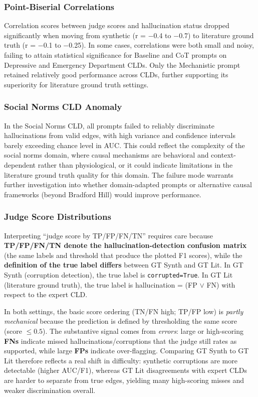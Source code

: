 \subsubsection{Point-Biserial Correlations}

Correlation scores between judge scores and hallucination status dropped significantly when moving from synthetic (r = $-$0.4 to $-$0.7) to literature ground truth (r = $-$0.1 to $-$0.25). In some cases, correlations were both small and noisy, failing to attain statistical significance for Baseline and CoT prompts on Depressive and Emergency Department CLDs. Only the Mechanistic prompt retained relatively good performance across CLDs, further supporting its superiority for literature ground truth settings.

\subsubsection{Social Norms CLD Anomaly}

In the Social Norms CLD, all prompts failed to reliably discriminate hallucinations from valid edges, with high variance and confidence intervals barely exceeding chance level in AUC. This could reflect the complexity of the social norms domain, where causal mechanisms are behavioral and context-dependent rather than physiological, or it could indicate limitations in the literature ground truth quality for this domain. The failure mode warrants further investigation into whether domain-adapted prompts or alternative causal frameworks (beyond Bradford Hill) would improve performance.

\subsubsection{Judge Score Distributions}

Interpreting ``judge score by TP/FP/FN/TN'' requires care because \textbf{TP/FP/FN/TN denote the hallucination-detection confusion matrix} (the same labels and threshold that produce the plotted F1 scores), while the \textbf{definition of the true label differs} between GT Synth and GT Lit. In GT Synth (corruption detection), the true label is \texttt{corrupted=True}. In GT Lit (literature ground truth), the true label is hallucination = (FP $\lor$ FN) with respect to the expert CLD.

In both settings, the basic score ordering (TN/FN high; TP/FP low) is \textit{partly mechanical} because the prediction is defined by thresholding the same score (score $\le 0.5$). The substantive signal comes from \textit{errors}: large or high-scoring \textbf{FNs} indicate missed hallucinations/corruptions that the judge still rates as supported, while large \textbf{FPs} indicate over-flagging. Comparing GT Synth to GT Lit therefore reflects a real shift in difficulty: synthetic corruptions are more detectable (higher AUC/F1), whereas GT Lit disagreements with expert CLDs are harder to separate from true edges, yielding many high-scoring misses and weaker discrimination overall.

